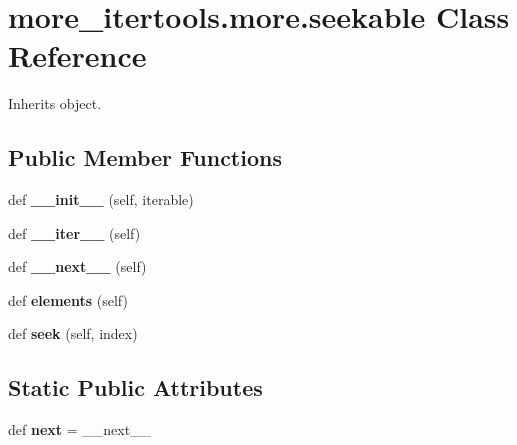 \hypertarget{classmore__itertools_1_1more_1_1seekable}{}\section{more\+\_\+itertools.\+more.\+seekable Class Reference}
\label{classmore__itertools_1_1more_1_1seekable}


Inherits object.

\subsection*{Public Member Functions}
\begin{DoxyCompactItemize}
\item 
\mbox{\label{classmore__itertools_1_1more_1_1seekable_a90b67cb6fa3335dcabbd9cbb362255ee}} 
def {\bfseries \+\_\+\+\_\+init\+\_\+\+\_\+} (self, iterable)
\item 
\mbox{\label{classmore__itertools_1_1more_1_1seekable_a6c990b24f2289600f6b7e17dd0ec323d}} 
def {\bfseries \+\_\+\+\_\+iter\+\_\+\+\_\+} (self)
\item 
\mbox{\label{classmore__itertools_1_1more_1_1seekable_aeaa88e3867e050897503488edffabcbe}} 
def {\bfseries \+\_\+\+\_\+next\+\_\+\+\_\+} (self)
\item 
\mbox{\label{classmore__itertools_1_1more_1_1seekable_a1aaa89c5313198dd0c83d0486c00602d}} 
def {\bfseries elements} (self)
\item 
\mbox{\label{classmore__itertools_1_1more_1_1seekable_af55f741bc7010441bec76fdac6b35cc3}} 
def {\bfseries seek} (self, index)
\end{DoxyCompactItemize}
\subsection*{Static Public Attributes}
\begin{DoxyCompactItemize}
\item 
\mbox{\label{classmore__itertools_1_1more_1_1seekable_a8cf943f5e74581093ad1fb3fa44cac3b}} 
def {\bfseries next} = \+\_\+\+\_\+next\+\_\+\+\_\+
\end{DoxyCompactItemize}


